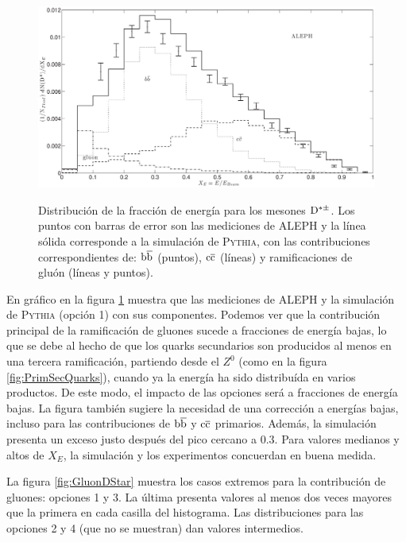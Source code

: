 \begin{figure}[h]
\centering
\caption[Espectro de la fracción de energía de los mesones $\D^{*\pm}$.]{Distribución de la fracción de energía para los mesones  $\D^{*\pm}$. Los puntos con barras de error son las mediciones de ALEPH  y la línea sólida corresponde a la simulación de \textsc{Pythia}, con las contribuciones correspondientes de: ${\mathrm b}\overline{\mathrm b}$ (puntos), ${\mathrm c}\overline{\mathrm c}$ (líneas) y ramificaciones de gluón (líneas y puntos).}
\includegraphics[width=15cm]{DStarOp1Thesis}
\label{fig:ALEPHPythia1}
\end{figure}



En gráfico en la figura \ref{fig:ALEPHPythia1} muestra que las mediciones de ALEPH y la simulación de \textsc{Pythia} (opción 1) con sus componentes. Podemos ver que la contribución principal de la ramificación de gluones sucede a fracciones de energía bajas, lo que se debe al hecho de que los quarks secundarios son producidos al menos en una tercera ramificación, partiendo desde el $Z^0$ (como en la figura \ref{fig:PrimSecQuarks}), cuando ya la energía ha sido distribuída en varios productos. De este modo, el impacto de las opciones será a fracciones de energía bajas. La figura también sugiere la necesidad de una corrección a energías bajas, incluso para las contribuciones de ${\mathrm b}\overline{\mathrm b}$ y ${\mathrm c}\overline{\mathrm c}$ primarios. Además, la simulación presenta un exceso justo después del pico cercano a $0.3$. Para valores medianos y altos de $X_E$, la simulación y los experimentos concuerdan en buena medida.

La figura \ref{fig:GluonDStar} muestra los casos extremos para la contribución de gluones: opciones 1 y 3. La última presenta valores al menos dos veces mayores que la primera en cada casilla del histograma. Las distribuciones para las opciones 2 y 4 (que no se muestran) dan valores intermedios.

